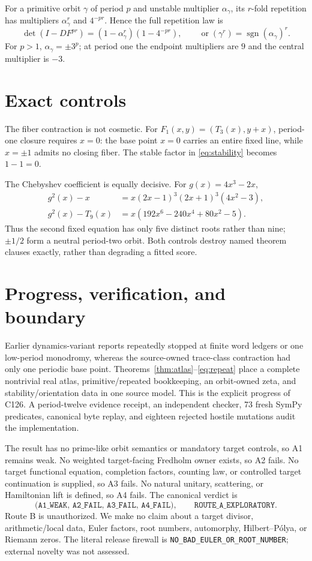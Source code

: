 \documentclass[10pt]{article}
\begin{document}
For a primitive orbit $\gamma$ of period $p$ and unstable multiplier
$\alpha_\gamma$, its $r$-fold repetition has multipliers
$\alpha_\gamma^r$ and $4^{-pr}$.  Hence the full repetition law is
\begin{equation}\label{eq:repeat}
 \det(I-DF^{pr})=(1-\alpha_\gamma^r)(1-4^{-pr}),\qquad
 \operatorname{or}(\gamma^r)=\operatorname{sgn}(\alpha_\gamma)^r.
\end{equation}
For $p>1$, $\alpha_\gamma=\pm3^p$; at period one the endpoint multipliers are
$9$ and the central multiplier is $-3$.

\section{Exact controls}
The fiber contraction is not cosmetic.  For
$F_1(x,y)=(T_3(x),y+x)$, period-one closure requires $x=0$: the base point
$x=0$ carries an entire fixed line, while $x=\pm1$ admits no closing fiber.
The stable factor in \eqref{eq:stability} becomes $1-1=0$.

The Chebyshev coefficient is equally decisive.  For $g(x)=4x^3-2x$,
\begin{align*}
 g^2(x)-x&=x(2x-1)^3(2x+1)^3(4x^2-3),\\
 g^2(x)-T_9(x)&=x(192x^6-240x^4+80x^2-5).
\end{align*}
Thus the second fixed equation has only five distinct roots rather than nine;
$\pm1/2$ form a neutral period-two orbit.  Both controls destroy named theorem
clauses exactly, rather than degrading a fitted score.

\section{Progress, verification, and boundary}
Earlier dynamics-variant reports repeatedly stopped at finite word ledgers or
one low-period monodromy, whereas the source-owned trace-class contraction had
only one periodic base point.  Theorems~\ref{thm:atlas}--\eqref{eq:repeat}
place a complete nontrivial real atlas, primitive/repeated bookkeeping, an
orbit-owned zeta, and stability/orientation data in one source model.  This is
the explicit progress of C126.  A period-twelve evidence receipt, an
independent checker, 73 fresh SymPy predicates, canonical byte replay, and
eighteen rejected hostile mutations audit the implementation.

The result has no prime-like orbit semantics or mandatory target controls, so
A1 remains weak.  No weighted target-facing Fredholm owner exists, so A2
fails.  No target functional equation, completion factors, counting law, or
controlled target continuation is supplied, so A3 fails.  No natural unitary,
scattering, or Hamiltonian lift is defined, so A4 fails.  The canonical verdict
is
\[
 \texttt{(A1\_WEAK, A2\_FAIL, A3\_FAIL, A4\_FAIL)},\qquad
 \texttt{ROUTE\_A\_EXPLORATORY}.
\]
Route B is unauthorized.  We make no claim about a target divisor,
arithmetic/local data, Euler factors, root numbers, automorphy,
Hilbert--P\'olya, or Riemann zeros.  The literal release firewall is
\texttt{NO\_BAD\_EULER\_OR\_ROOT\_NUMBER}; external novelty was not assessed.
\end{document}
